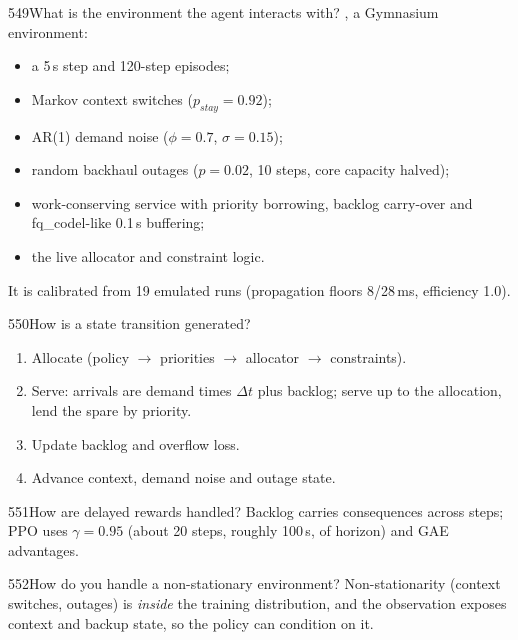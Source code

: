 \begin{qa}{549}{What is the environment the agent interacts with?}
, a Gymnasium environment:
\begin{itemize}
\item a 5\,s step and 120-step episodes;
\item Markov context switches ($p_{stay}=0.92$);
\item AR(1) demand noise ($\phi=0.7$, $\sigma=0.15$);
\item random backhaul outages ($p=0.02$, 10 steps, core capacity halved);
\item work-conserving service with priority borrowing, backlog carry-over and fq\_codel-like 0.1\,s buffering;
\item the live allocator and constraint logic.
\end{itemize}
It is calibrated from 19 emulated runs (propagation floors 8/28\,ms, efficiency 1.0).
\end{qa}

\begin{qa}{550}{How is a state transition generated?}
\begin{enumerate}
\item Allocate (policy $\rightarrow$ priorities $\rightarrow$ allocator $\rightarrow$ constraints).
\item Serve: arrivals are demand times $\Delta t$ plus backlog; serve up to the allocation, lend the spare by priority.
\item Update backlog and overflow loss.
\item Advance context, demand noise and outage state.
\end{enumerate}
\end{qa}

\begin{qa}{551}{How are delayed rewards handled?}
Backlog carries consequences across steps; PPO uses $\gamma=0.95$ (about 20 steps, roughly 100\,s, of horizon) and
GAE advantages.
\end{qa}

\begin{qa}{552}{How do you handle a non-stationary environment?}
Non-stationarity (context switches, outages) is \emph{inside} the training distribution, and the observation exposes
context and backup state, so the policy can condition on it.
\end{qa}

